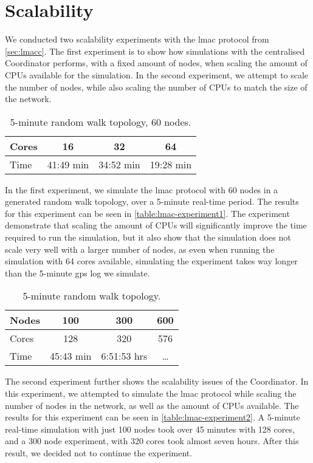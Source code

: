 \section{Scalability}\label{sec:scalability}
We conducted two scalability experiments with the \gls{lmac} protocol from \autoref{sec:lmacc}. The first
experiment is to show how simulations with the centralised Coordinator performs, with a fixed amount of nodes,
when scaling the amount of CPUs available for the simulation. In the second experiment, we attempt to scale
the number of nodes, while also scaling the number of CPUs to match the size of the network.

\begin{table}[H]
    \begin{tabular}{|l|c|c|c|}
        \hline
        Cores & 16        & 32        & 64        \\ \hline
        Time  & 41:49 min & 34:52 min & 19:28 min \\ \hline
    \end{tabular}
    \caption{5-minute random walk topology, 60 nodes.}\label{table:lmac-experiment1}
\end{table}

In the first experiment, we simulate the \gls{lmac} protocol with 60 nodes in a generated random walk
topology, over a 5-minute real-time period. The results for this experiment can be seen in
\autoref{table:lmac-experiment1}. The experiment demonstrate that scaling the amount of CPUs will
significantly improve the time required to run the simulation, but it also show that the simulation does not
scale very well with a larger number of nodes, as even when running the simulation with 64 cores available,
simulating the experiment takes way longer than the 5-minute \gls{gps} log we simulate.

\begin{table}[H]
    \begin{tabular}{|l|c|c|c|}
        \hline
        Nodes & 100       & 300         & 600   \\ \hline
        Cores & 128       & 320         & 576   \\ \hline
        Time  & 45:43 min & 6:51:53 hrs & \dots \\ \hline
    \end{tabular}
    \caption{5-minute random walk topology.}\label{table:lmac-experiment2}
\end{table}

The second experiment further shows the scalability issues of the Coordinator. In this experiment, we
attempted to simulate the \gls{lmac} protocol while scaling the number of nodes in the network, as well as the
amount of CPUs available. The results for this experiment can be seen in \autoref{table:lmac-experiment2}. A
5-minute real-time simulation with just 100 nodes took over 45 minutes with 128 cores, and a 300 node
experiment, with 320 cores took almost seven hours. After this result, we decided not to continue the
experiment.

